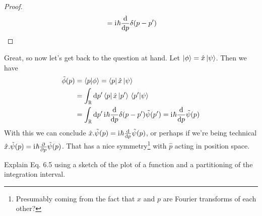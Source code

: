 \documentclass[boxes,pages]{homework}
\makeatletter
\newcommand{\iu}{\mathrm{i}\mkern1mu}
\numberwithin{@problem}{section}
\makeatother
\begin{document}
\begin{solution}
\begin{proof}
\begin{align*}
			                        & = \iu\hbar\dv{p}\delta(p-p')                                                                                                                 \\
		\end{align*}
	\end{proof}
	Great, so now let's get back to the question at hand. Let $\ket{\phi} = \hat{x}\ket{\psi}$. Then we have
	\begin{align*}
		\tilde{\phi}(p) & = \braket{p}{\phi} = \bra{p}\hat{x}\ket{\psi}                                                      \\
		                & = \int_\mathbb{R}\dd{p'}\bra{p}\hat{x}\ket*{p'}\braket*{p'}{\psi}                                  \\
		                & = \int_\mathbb{R}\dd{p'}\iu\hbar\dv{p}\delta(p-p')\tilde{\psi}(p') = \iu\hbar\dv{p}\tilde{\psi}(p)
	\end{align*}
	With this we can conclude $\hat{x}.\tilde{\psi}(p) = \iu\hbar\dv{p}\tilde{\psi}(p)$, or perhaps if we're being technical $\hat{x}.\tilde{\psi}(p) = \iu\hbar\pdv{p}\tilde{\psi}(p)$. That has a nice symmetry\footnote{Presumably coming from the fact that $x$ and $p$ are Fourier transforms of each other?} with $\hat{p}$ acting in position space.

\end{solution}

\setcounter{section}{6}

\begin{problem}
Explain Eq. 6.5 using a sketch of the plot of a function and a partitioning of the integration interval.
\end{problem}
\end{document}
